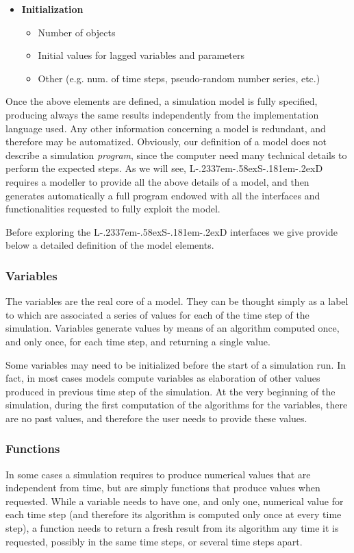 \documentclass [11pt,a4paper] {book}
\def\LsD{{L\kern-.2337em\lower-.58ex\hbox{S}\kern-.181em\lower-.2ex\hbox{D}}\xspace}
\begin{document}
\begin{itemize}
\item \textbf{Initialization }\vspace{-0.3cm}
 \begin{itemize}
  \item Number of objects \vspace{-0.2cm}
  \item Initial values for lagged variables and parameters \vspace{-0.2cm}
  \item Other (e.g. num. of time steps, pseudo-random number series, etc.) \vspace{-0.2cm}
 \end{itemize}
\end{itemize}

Once the above elements are defined, a simulation model is fully specified, producing always the same results independently from the implementation language used. Any other information concerning a model is redundant, and therefore may be automatized. Obviously, our  definition of a model does not describe a simulation \textit{program}, since the computer need many technical details to perform the expected steps. As we will see, \LsD requires a modeller to provide all the above details of a model, and then generates automatically a full program endowed with all the interfaces and functionalities requested to fully exploit the model.

Before exploring the \LsD interfaces we give provide below a detailed definition of the model elements.

\subsubsection{Variables}
The variables are the real core of a model. They can be thought simply as a label to
which are associated a series of values for each of the time step of the simulation. Variables generate values by means of an algorithm computed once, and only once, for each time step, and returning a single
value. 

Some variables may need to be initialized before the start of a simulation run. In
fact, in most cases models compute variables as elaboration of other values produced in
previous time step of the simulation. At the very beginning of the simulation, during the
first computation of the algorithms for the variables, there are no past values, and
therefore the user needs to provide these values.

\subsubsection{Functions}
In some cases a simulation requires to produce numerical values that are independent from
time, but are simply functions that produce values when requested. While a variable needs
to have one, and only one, numerical value for each time step (and therefore its
algorithm is computed only once at every time step), a function needs to return a fresh
result from its algorithm any time it is requested, possibly in the same time steps, or several time steps apart.
\end{document}
